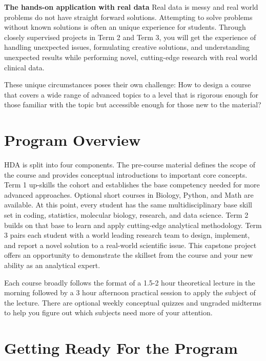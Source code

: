 \documentclass[
]{book}
\begin{document}
\textbf{The hands-on application with real data} Real data is messy and real world problems do not have straight forward solutions. Attempting to solve problems without known solutions is often an unique experience for students. Through closely supervised projects in Term 2 and Term 3, you will get the experience of handling unexpected issues, formulating creative solutions, and understanding unexpected results while performing novel, cutting-edge research with real world clinical data.

These unique circumstances poses their own challenge: How to design a course that covers a wide range of advanced topics to a level that is rigorous enough for those familiar with the topic but accessible enough for those new to the material?

\section*{Program Overview}\label{program-overview}

HDA is split into four components. The pre-course material defines the scope of the course and provides conceptual introductions to important core concepts. Term 1 up-skills the cohort and establishes the base competency needed for more advanced approaches. Optional short courses in Biology, Python, and Math are available. At this point, every student has the same multidisciplinary base skill set in coding, statistics, molecular biology, research, and data science. Term 2 builds on that base to learn and apply cutting-edge analytical methodology. Term 3 pairs each student with a world leading research team to design, implement, and report a novel solution to a real-world scientific issue. This capstone project offers an opportunity to demonstrate the skillset from the course and your new ability as an analytical expert.

Each course broadly follows the format of a 1.5-2 hour theoretical lecture in the morning followed by a 3 hour afternoon practical session to apply the subject of the lecture. There are optional weekly conceptual quizzes and ungraded midterms to help you figure out which subjects need more of your attention.

\section*{Getting Ready For the Program}\label{getting-ready-for-the-program}
\end{document}
